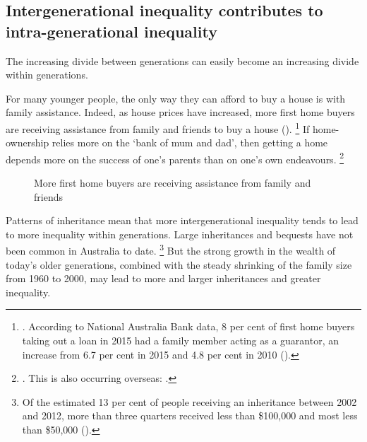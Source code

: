 \subsection{Intergenerational inequality contributes to intra-generational inequality}\label{subsec:rising-house-prices-will-also-contribute-to-intra-generational-inequality-over-time}

The increasing divide between generations can easily become an increasing divide within generations.

For many younger people, the only way they can afford to buy a house is with family assistance.
Indeed, as house prices have increased, more first home buyers are receiving assistance from family and friends to buy a house ().%
	\footnote{\textcite{Ellis-2017-Speech-Aust-Housing-Researchers}.
	According to National Australia Bank data, 8 per cent of first home buyers taking out a loan in 2015 had a family member acting as a guarantor,
	 an increase from 6.7 per cent in 2015 and 4.8 per cent in 2010 (\textcite{Yeates-2016-more-parents-guaranteeing-kids}).}
If home-ownership relies more on the `bank of mum and dad', then getting a home depends more on the success of one's parents than on one's own endeavours.%
	\footnote{\textcite[][6--7]{RBA2014SubmissionAffordableHousingInquiry}.
This is also occurring overseas: \textcite{Gholipour-etal-2016-theConvo-Higher-property-prices-linked-to-ineq}.}

\begin{figure}
\caption{More first home buyers are receiving assistance from family and friends}\label{fig:assistance-to-buy-house}
\end{figure}

Patterns of inheritance mean that more intergenerational inequality tends to lead to more inequality within generations. 
Large inheritances and bequests have not been common in Australia to date.%
  \footnote{Of the estimated 13 per cent of people receiving an inheritance between 2002 and 2012, more than three quarters received less than \$100,000 and most less than \$50,000 (\textcite[][37]{DaleyWoodWeidmannHarrison-2014-Wealth-of-generations}).} 
But the strong growth in the wealth of today's older generations, combined with the steady shrinking of the family size from 1960 to 2000, may lead to more and larger inheritances and greater inequality.

